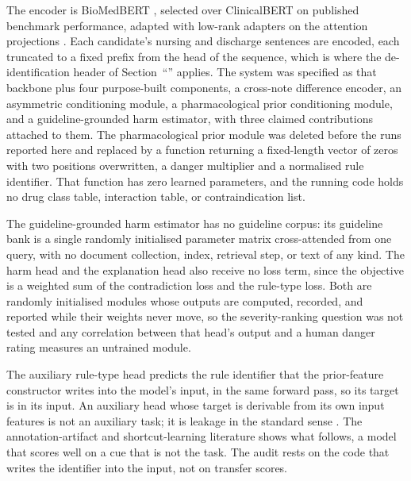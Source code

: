 The encoder is BioMedBERT \citep[released as PubMedBERT;][]{gu2021biomedbert}, selected over
ClinicalBERT \citep{alsentzer2019clinicalbert} on published benchmark performance, adapted with
low-rank adapters on the attention projections \citep{hu2022lora}. Each candidate's nursing and
discharge sentences are encoded, each truncated to a fixed prefix from the head of the sequence,
which is where the de-identification header of Section~``'' applies. The
system was specified as that backbone plus four purpose-built components, a cross-note difference
encoder, an asymmetric conditioning module, a pharmacological prior conditioning module, and a
guideline-grounded harm estimator, with three claimed contributions attached to them.  The
pharmacological prior module was deleted before the runs reported here and replaced by a function returning a
fixed-length vector of zeros with two positions overwritten, a danger multiplier and a normalised
rule identifier. That function has zero learned parameters, and the running code holds no drug class
table, interaction table, or contraindication list.

The guideline-grounded harm estimator has no guideline corpus: its guideline bank is a single
randomly initialised parameter matrix cross-attended from one query, with no document collection,
index, retrieval step, or text of any kind. The harm head and the explanation head also receive no
loss term, since the objective is a weighted sum of the contradiction loss and the rule-type loss. Both are randomly initialised modules whose outputs are computed, recorded, and reported
while their weights never move, so the severity-ranking question was not tested and any
correlation between that head's output and a human danger rating measures an untrained
module.

The auxiliary rule-type head predicts the rule identifier that the prior-feature constructor writes
into the model's input, in the same forward pass, so its target is in its input. An auxiliary head whose target is derivable from its own input features is not an auxiliary
task; it is leakage in the standard sense \citep{kaufman2012leakage}. The annotation-artifact and shortcut-learning literature
\citep{poliak2018hypothesis,gururangan2018artifacts,mccoy2019hans,geirhos2020shortcut,zech2018generalization}
shows what follows, a model that scores well on a cue that is not the task. The audit rests on the code that writes the identifier into the
input, not on transfer scores.

